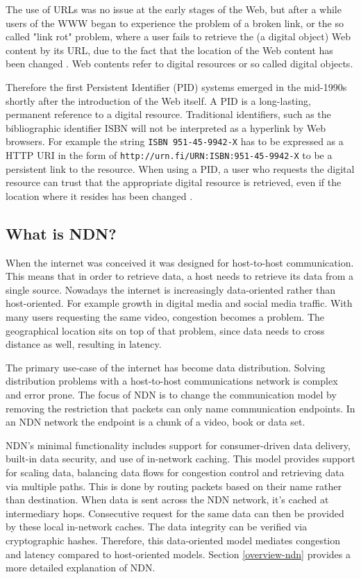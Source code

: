 The use of URLs was no issue at the early stages of the Web, but after a while users of the WWW began to experience the problem of a broken link, or the  so called "link rot" problem, 
where a user fails to retrieve the (a digital object) Web content by its URL, 
due to the fact that the location of the Web content has been changed \cite{icn-bd, ark-id}. 
Web contents refer to digital resources or so called digital objects.

Therefore the first Persistent Identifier (PID) systems emerged in the mid-1990s shortly after the introduction of the Web itself. 
A PID is a long-lasting, permanent reference to a digital resource. Traditional identifiers, such as the bibliographic identifier ISBN will not be interpreted as a 
hyperlink by Web browsers. For example the string \texttt{ISBN 951-45-9942-X} has to be expressed as a HTTP URI in the form of \texttt{http://urn.fi/URN:ISBN:951-45-9942-X} to be a persistent link to the resource.  
When using a PID, a user who requests the digital resource can trust that the appropriate digital resource is retrieved, 
even if the location where it resides has been changed \cite{pid-oview}.

\subsection{What is NDN?}
When the internet was conceived it was designed for host-to-host communication. This means that in order to retrieve data, a host needs to retrieve its data from a single source. Nowadays the internet is increasingly data-oriented rather than host-oriented. For example growth in digital media and social media traffic. With many users requesting the same video, congestion becomes a problem. The geographical location sits on top of that problem, since data needs to cross distance as well, resulting in latency.

The primary use-case of the internet has become data distribution. Solving distribution problems with a host-to-host communications network is complex and error prone. The focus of NDN \cite{ndn-summary} is to change the communication model by removing the restriction that packets can only name communication endpoints. In an NDN network the endpoint is a chunk of a video, book or data set.

NDN’s minimal functionality includes support for consumer-driven data delivery, built-in data security, and use of in-network caching. This model provides support for scaling data, balancing data flows for congestion control and retrieving data via multiple paths. This is done by routing packets based on their name rather than destination. When data is sent across the NDN network, it's cached at intermediary hops. Consecutive request for the same data can then be provided by these local in-network caches. The data integrity can be verified via cryptographic hashes. Therefore, this data-oriented model mediates congestion and latency compared to host-oriented models. Section \ref{overview-ndn} provides a more detailed explanation of NDN.

